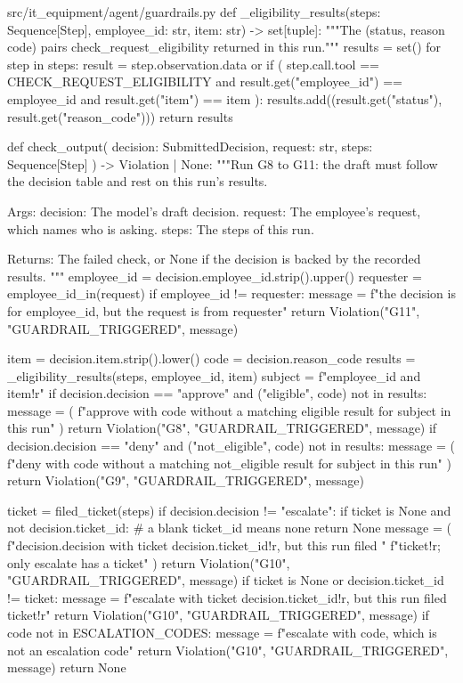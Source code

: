 \documentclass[11pt,letterpaper]{article}
\renewcommand{\_}{\textunderscore\allowbreak}
\begin{document}
\begin{codebox}{src/it_equipment/agent/guardrails.py}
def _eligibility_results(steps: Sequence[Step], employee_id: str, item: str) -> set[tuple]:
    """The (status, reason code) pairs check_request_eligibility returned in this run."""
    results = set()
    for step in steps:
        result = step.observation.data or {}
        if (
            step.call.tool == CHECK_REQUEST_ELIGIBILITY
            and result.get("employee_id") == employee_id
            and result.get("item") == item
        ):
            results.add((result.get("status"), result.get("reason_code")))
    return results


def check_output(
    decision: SubmittedDecision, request: str, steps: Sequence[Step]
) -> Violation | None:
    """Run G8 to G11: the draft must follow the decision table and rest on this run's results.

    Args:
        decision: The model's draft decision.
        request: The employee's request, which names who is asking.
        steps: The steps of this run.

    Returns:
        The failed check, or None if the decision is backed by the recorded results.
    """
    employee_id = decision.employee_id.strip().upper()
    requester = employee_id_in(request)
    if employee_id != requester:
        message = f"the decision is for {employee_id}, but the request is from {requester}"
        return Violation("G11", "GUARDRAIL_TRIGGERED", message)

    item = decision.item.strip().lower()
    code = decision.reason_code
    results = _eligibility_results(steps, employee_id, item)
    subject = f"{employee_id} and {item!r}"
    if decision.decision == "approve" and ("eligible", code) not in results:
        message = (
            f"approve with {code} without a matching eligible result for {subject} in this run"
        )
        return Violation("G8", "GUARDRAIL_TRIGGERED", message)
    if decision.decision == "deny" and ("not_eligible", code) not in results:
        message = (
            f"deny with {code} without a matching not_eligible result for {subject} in this run"
        )
        return Violation("G9", "GUARDRAIL_TRIGGERED", message)

    ticket = filed_ticket(steps)
    if decision.decision != "escalate":
        if ticket is None and not decision.ticket_id:  # a blank ticket_id means none
            return None
        message = (
            f"{decision.decision} with ticket {decision.ticket_id!r}, but this run filed "
            f"{ticket!r}; only escalate has a ticket"
        )
        return Violation("G10", "GUARDRAIL_TRIGGERED", message)
    if ticket is None or decision.ticket_id != ticket:
        message = f"escalate with ticket {decision.ticket_id!r}, but this run filed {ticket!r}"
        return Violation("G10", "GUARDRAIL_TRIGGERED", message)
    if code not in ESCALATION_CODES:
        message = f"escalate with {code}, which is not an escalation code"
        return Violation("G10", "GUARDRAIL_TRIGGERED", message)
    return None
\end{codebox}
\end{document}
